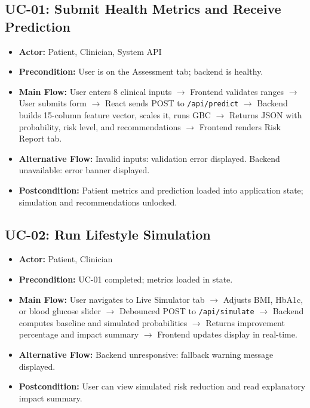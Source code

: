 \documentclass[12pt,a4paper]{report}
\begin{document}
\subsection*{UC-01: Submit Health Metrics and Receive Prediction}
\begin{itemize}
    \item \textbf{Actor:} Patient, Clinician, System API
    \item \textbf{Precondition:} User is on the Assessment tab; backend is healthy.
    \item \textbf{Main Flow:} User enters 8 clinical inputs $\rightarrow$ Frontend validates ranges $\rightarrow$ User submits form $\rightarrow$ React sends POST to \texttt{/api/predict} $\rightarrow$ Backend builds 15-column feature vector, scales it, runs GBC $\rightarrow$ Returns JSON with probability, risk level, and recommendations $\rightarrow$ Frontend renders Risk Report tab.
    \item \textbf{Alternative Flow:} Invalid inputs: validation error displayed. Backend unavailable: error banner displayed.
    \item \textbf{Postcondition:} Patient metrics and prediction loaded into application state; simulation and recommendations unlocked.
\end{itemize}

\subsection*{UC-02: Run Lifestyle Simulation}
\begin{itemize}
    \item \textbf{Actor:} Patient, Clinician
    \item \textbf{Precondition:} UC-01 completed; metrics loaded in state.
    \item \textbf{Main Flow:} User navigates to Live Simulator tab $\rightarrow$ Adjusts BMI, HbA1c, or blood glucose slider $\rightarrow$ Debounced POST to \texttt{/api/simulate} $\rightarrow$ Backend computes baseline and simulated probabilities $\rightarrow$ Returns improvement percentage and impact summary $\rightarrow$ Frontend updates display in real-time.
    \item \textbf{Alternative Flow:} Backend unresponsive: fallback warning message displayed.
    \item \textbf{Postcondition:} User can view simulated risk reduction and read explanatory impact summary.
\end{itemize}
\end{document}
